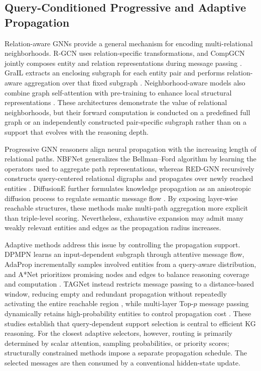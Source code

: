 \documentclass[a4paper,fleqn]{cas-sc}
\begin{document}
\subsection{Query-Conditioned Progressive and Adaptive Propagation}
\label{subsec:gnn_for_kg}

Relation-aware GNNs provide a general mechanism for encoding multi-relational
neighborhoods. R-GCN uses relation-specific transformations, and CompGCN jointly
composes entity and relation representations during message passing
\citep{schlichtkrull2018modeling,vashishth2019composition}. GraIL extracts an
enclosing subgraph for each entity pair and performs relation-aware aggregation
over that fixed subgraph \citep{teru2020grail}. Neighborhood-aware models also
combine graph self-attention with pre-training to enhance local structural
representations \citep{wu2023neighborhood}. These architectures demonstrate the
value of relational neighborhoods, but their forward computation is conducted
on a predefined full graph or an independently constructed pair-specific
subgraph rather than on a support that evolves with the reasoning depth.

Progressive GNN reasoners align neural propagation with the increasing length of
relational paths. NBFNet generalizes the Bellman--Ford algorithm by learning the
operators used to aggregate path representations, whereas RED-GNN recursively
constructs query-centered relational digraphs and propagates over newly reached
entities \citep{zhu2021neural,zhang2022knowledge}. DiffusionE further formulates
knowledge propagation as an anisotropic diffusion process to regulate semantic
message flow \citep{cao2024diffusione}. By exposing layer-wise reachable
structures, these methods make multi-path aggregation more explicit than
triple-level scoring. Nevertheless, exhaustive expansion may admit many weakly
relevant entities and edges as the propagation radius increases.

Adaptive methods address this issue by controlling the propagation support.
DPMPN learns an input-dependent subgraph through attentive message flow,
AdaProp incrementally samples involved entities from a query-aware distribution,
and A*Net prioritizes promising nodes and edges to balance reasoning coverage
and computation \citep{xu2019dpmpn,zhang2022adaprop,zhu2023astarnet}. TAGNet
instead restricts message passing to a distance-based window, reducing empty and
redundant propagation without repeatedly activating the entire reachable region
\citep{shomer2023distance}, while multi-layer Top-$p$ message passing dynamically
retains high-probability entities to control propagation cost
\citep{liu2025topp}. These studies establish that query-dependent support
selection is central to efficient KG reasoning. For the closest adaptive
selectors, however, routing is primarily determined by scalar attention,
sampling probabilities, or priority scores; structurally constrained methods
impose a separate propagation schedule. The selected messages are then consumed
by a conventional hidden-state update.
\end{document}
